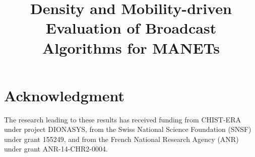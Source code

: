 \documentclass[10pt, conference, letterpaper]{IEEEtran}
\begin{document}

\title{Density and Mobility-driven Evaluation of Broadcast Algorithms for MANETs}

 \author{
}
\maketitle





\IEEEpeerreviewmaketitle



\section*{Acknowledgment}
The research leading to these results has received funding from CHIST-ERA under project DIONASYS, from the Swiss National Science Foundation (SNSF) under grant 155249, and from the French National Research Agency (ANR) under grant ANR-14-CHR2-0004.





%
\end{document}
